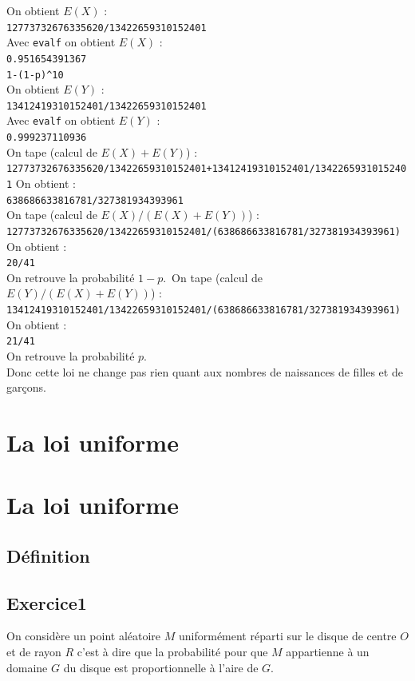 \documentclass[a4paper,11pt]{book}
\begin{document}
\begin{itemize}
On obtient $E(X)$ :\\
{\tt 12773732676335620/13422659310152401}\\
Avec {\tt evalf} on obtient $E(X)$ :\\
{\tt 0.951654391367}\\
{\tt 1-(1-p)\verb|^|10}\\
On obtient $E(Y)$ :\\
{\tt 13412419310152401/13422659310152401}\\
Avec {\tt evalf} on obtient $E(Y)$ :\\
{\tt 0.999237110936}\\
On tape (calcul de $E(X)+E(Y)$) :\\
{\tt 12773732676335620/13422659310152401+13412419310152401/13422659310152401}
On obtient :\\
{\tt 638686633816781/327381934393961}\\
On tape (calcul de $E(X)/(E(X)+E(Y))$) :\\
{\tt 12773732676335620/13422659310152401/(638686633816781/327381934393961)}\\
On obtient :\\
{\tt 20/41}\\
On retrouve la probabilit\'e $1-p$.\
On tape (calcul de $E(Y)/(E(X)+E(Y))$) :\\
{\tt 13412419310152401/13422659310152401/(638686633816781/327381934393961)}\\
On obtient :\\
{\tt 21/41}\\
On retrouve la probabilit\'e $p$.\\
Donc cette loi ne change pas rien quant aux nombres de naissances de filles et 
de gar\c{c}ons.
\end{itemize}

\section{La loi uniforme}
\section{La loi uniforme}
\subsection{D\'efinition}
\subsection{Exercice1}
On consid\`ere un point al\'eatoire $M$ uniform\'ement r\'eparti sur le disque 
de centre $O$ et de rayon $R$ c'est \`a dire que la probabilit\'e pour que $M$ 
appartienne \`a un domaine $G$ du disque est proportionnelle \`a l'aire de $G$.
\end{document}
